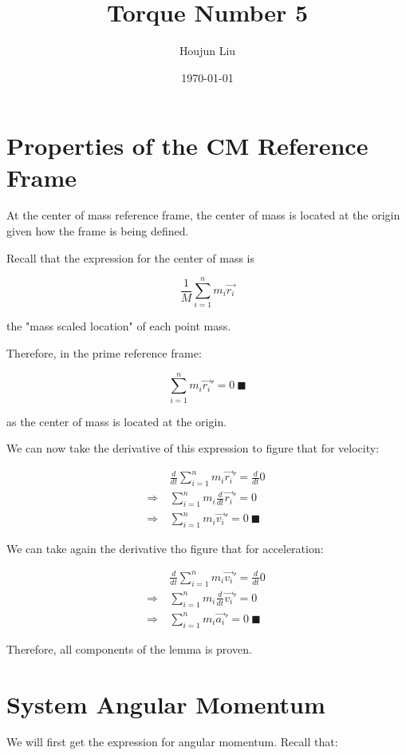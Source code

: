 \documentclass[letterpaper]{article}
\author{Houjun Liu}
\date{\today}
\title{Torque Number 5}
\renewcommand{\tableofcontents}{}
\renewcommand\maketitle{}
\begin{document}
\maketitle
\tableofcontents


\section{Properties of the CM Reference Frame}
\label{sec:org4682269}
At the center of mass reference frame, the center of mass is located at the origin given how the frame is being defined.

Recall that the expression for the center of mass is

\begin{equation}
   \frac{1}{M} \sum_{i=1}^n m_i \vec{r_i}
\end{equation}

the "mass scaled location" of each point mass. 

Therefore, in the prime reference frame:

\begin{equation}
   \sum_{i=1}^n m_i\vec{r_i}' = 0\ \blacksquare
\end{equation}

as the center of mass is located at the origin.

We can now take the derivative of this expression to figure that for velocity:

\begin{align}
   &\frac{d}{dt} \sum_{i=1}^n m_i\vec{r_i}' = \frac{d}{dt} 0\ \\
   \Rightarrow\ &\sum_{i=1}^n m_i\frac{d}{dt} \vec{r_i}' = 0\ \\
   \Rightarrow\ &\sum_{i=1}^n m_i\vec{v_i}' = 0\ \blacksquare
\end{align}

We can take again the derivative tho figure that for acceleration:

\begin{align}
   &\frac{d}{dt} \sum_{i=1}^n m_i\vec{v_i}' = \frac{d}{dt} 0\ \\
   \Rightarrow\ &\sum_{i=1}^n m_i\frac{d}{dt} \vec{v_i}' = 0\ \\
   \Rightarrow\ &\sum_{i=1}^n m_i\vec{a_i}' = 0\ \blacksquare
\end{align}

Therefore, all components of the lemma is proven.

\section{System Angular Momentum}
\label{sec:org8edc9f1}
We will first get the expression for angular momentum. Recall that:
\end{document}
